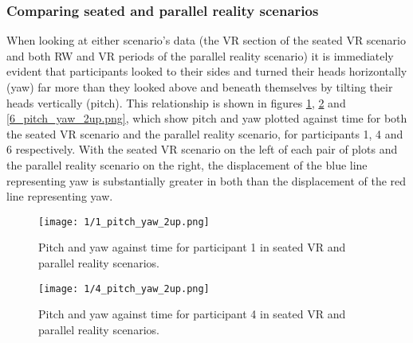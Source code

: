 
\subsubsection{Comparing seated and parallel reality scenarios}

When looking at either scenario's data (the VR section of the seated VR scenario and both RW and VR periods of the parallel reality scenario) it is immediately evident that participants looked to their sides and turned their heads horizontally (yaw) far more than they looked above and beneath themselves by tilting their heads vertically (pitch). This relationship is shown in figures \ref{1_pitch_yaw_2up.png}, \ref{4_pitch_yaw_2up.png} and \ref{6_pitch_yaw_2up.png}, which show pitch and yaw plotted against time for both the seated VR scenario and the parallel reality scenario, for participants 1, 4 and 6 respectively. With the seated VR scenario on the left of each pair of plots and the parallel reality scenario on the right, the displacement of the blue line representing yaw is substantially greater in both than the displacement of the red line representing yaw.

\begin{figure}
	\begin{center}
	\texttt{[image: 1/1\_pitch\_yaw\_2up.png]}
	\caption{Pitch and yaw against time for participant 1 in seated VR and parallel reality scenarios.}
	\label{1_pitch_yaw_2up.png}
	\end{center}
\end{figure}

\begin{figure}
	\begin{center}
	\texttt{[image: 1/4\_pitch\_yaw\_2up.png]}
	\caption{Pitch and yaw against time for participant 4 in seated VR and parallel reality scenarios.}
	\label{4_pitch_yaw_2up.png}
	\end{center}
\end{figure}

